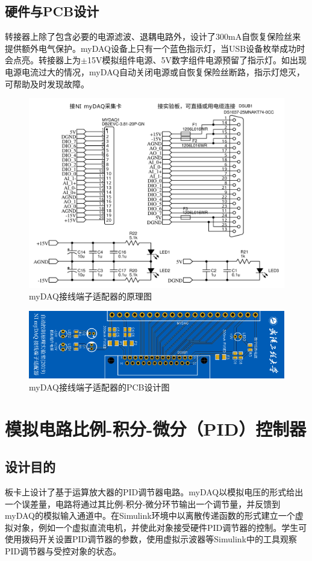 \documentclass[11pt,a4paper]{article}
\begin{document}
\subsection{硬件与PCB设计}
转接器上除了包含必要的电源滤波、退耦电路外，设计了300mA自恢复保险丝来提供额外电气保护。myDAQ设备上只有一个蓝色指示灯，当USB设备枚举成功时会点亮。转接器上为$\pm$15V模拟组件电源、5V数字组件电源预留了指示灯。如出现电源电流过大的情况，myDAQ自动关闭电源或自恢复保险丝断路，指示灯熄灭，可帮助及时发现故障。

\begin{figure}[h!]\centering
  \includegraphics[width=12cm]{./figs/conv_sch.pdf}
  \caption{myDAQ接线端子适配器的原理图}\label{conv_sch}
\end{figure}

\begin{figure}[h!]\centering
  \includegraphics[width=13cm]{./figs/conv_pcb.png}
  \caption{myDAQ接线端子适配器的PCB设计图}\label{conv_pcb}
\end{figure}


\section{模拟电路比例-积分-微分（PID）控制器}

\subsection{设计目的}
板卡上设计了基于运算放大器的PID调节器电路。myDAQ以模拟电压的形式给出一个误差量，电路将通过其比例-积分-微分环节输出一个调节量，并反馈到myDAQ的模拟输入通道中。在Simulink环境中以离散传递函数的形式建立一个虚拟对象，例如一个虚拟直流电机，并使此对象接受硬件PID调节器的控制。学生可使用拨码开关设置PID调节器的参数，使用虚拟示波器等Simulink中的工具观察PID调节器与受控对象的状态。
\end{document}
